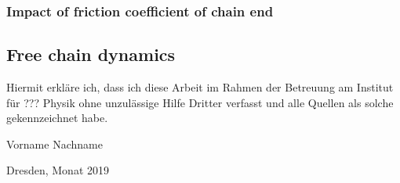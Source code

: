 \documentclass[
    paper=A4,pagesize=automedia,fontsize=12pt,
    BCOR=15mm,DIV=22,
    twoside,headinclude,footinclude=false,
    ngerman,fleqn,             %
    bibliography=totocnumbered,          %
    listof=totoc,                %
    listof=flat,                 %
    cleardoublepage=empty      %
    numbers=endperiod
]{scrartcl}
\begin{document}
\subsubsection{Impact of friction coefficient of chain end}

\subsection{Free chain dynamics}




\clearpage
\thispagestyle{empty}
\vspace*{1.5em}

Hiermit erkläre ich, dass ich diese Arbeit im Rahmen der Betreuung am Institut
für ??? Physik ohne unzulässige Hilfe Dritter verfasst und alle Quellen als solche gekennzeichnet habe.

\vspace*{45em}

Vorname Nachname \par
Dresden, Monat 2019



\end{document}
